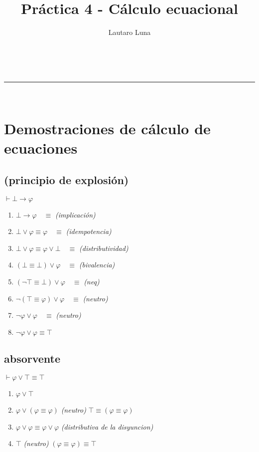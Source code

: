 \documentclass[a4paper,11pt]{article}
\makeatletter
\newcommand{\linia}{\rule{\linewidth}{0.5pt}}
\renewcommand{\maketitle}{
\begin{center}
\vspace{2ex}
{\Large \textsc{\@title}}
\vspace{1ex}
\\
\linia\\
\@author \hfill \@date
\vspace{4ex}
\end{center}
}
\makeatother
\begin{document}
\title{Práctica 4 - Cálculo ecuacional}

\author{Lautaro Luna}

\date{}

\maketitle

\vspace*{-1cm}

\section{Demostraciones de cálculo de ecuaciones}

\subsection{(principio de explosión)} \quad $\vdash \bot \to \varphi$

\begin{enumerate}
    \item $\bot \to \varphi \quad \equiv$ \textit{(implicación)}
    \item $\bot \lor \varphi \equiv \varphi \quad \equiv$ \textit{(idempotencia)}
    \item $\bot \lor \varphi \equiv \varphi \lor \bot \quad \equiv$ \textit{(distributividad)}
    \item $(\bot \equiv \bot) \lor \varphi \quad \equiv$ \textit{(bivalencia)}
    \item $(\neg \top \equiv \bot) \lor \varphi \quad \equiv$ \textit{(neq)}
    \item $\neg (\top \equiv \varphi) \lor \varphi \quad \equiv$ \textit{(neutro)}
    \item $\neg \varphi \lor \varphi \quad \equiv$ \textit{(neutro)}
    \item $\neg \varphi \lor \varphi \equiv \top$
\end{enumerate}

\subsection{absorvente} \quad $\vdash \varphi \lor \top \equiv \top$

\begin{enumerate}
    \item $\varphi \lor \top$
    \item $\varphi \lor (\varphi \equiv \varphi)$ \textit{(neutro)} $\top \equiv (\varphi \equiv \varphi)$
    \item $\varphi \lor \varphi \equiv \varphi \lor \varphi$ \textit{(distributiva de la disyuncion)}
    \item $\top$ \textit{(neutro)} $(\varphi \equiv \varphi) \equiv \top$
\end{enumerate}
\end{document}
